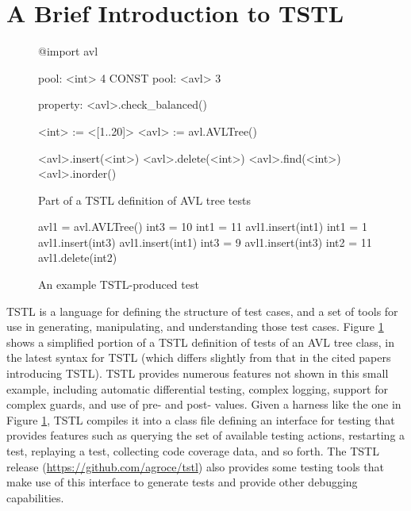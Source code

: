 \section{A Brief Introduction to TSTL}

\begin{figure}
{\scriptsize
\begin{code}
@import avl

pool: <int> 4 CONST
pool: <avl> 3

property: <avl>.check\_balanced()

<int> := <[1..20]>
<avl> := avl.AVLTree()

<avl>.insert(<int>)
<avl>.delete(<int>)
<avl>.find(<int>)
<avl>.inorder()
\end{code}
}
\caption{Part of a TSTL definition of AVL tree tests}
\label{fig:example}
\end{figure}

\begin{figure}
{\scriptsize
\begin{code}
avl1 = avl.AVLTree()  
int3 = 10  
int1 = 11  
avl1.insert(int1) 
int1 = 1  
avl1.insert(int3) 
avl1.insert(int1) 
int3 = 9  
avl1.insert(int3) 
int2 = 11  
avl1.delete(int2) 
\end{code}
}
\caption{An example TSTL-produced test}
\label{fig:avlrun}
\end{figure}

TSTL \cite{NFM15,ISSTA15} is a language for defining the structure of
test cases, and a set of tools for use in generating, manipulating,
and understanding those test cases.  Figure \ref{fig:example} shows a
simplified portion of a TSTL definition of tests of an AVL tree class,
in the latest syntax for TSTL (which differs slightly from that in the
cited papers introducing TSTL).  TSTL provides numerous features not
shown in this small example, including automatic differential testing,
complex logging, support for complex guards, and use of pre- and post-
values.  Given a harness like the one in Figure \ref{fig:example},
TSTL compiles it into a class file defining an interface for testing
that provides features such as querying the set of available testing
actions, restarting a test, replaying a test, collecting code coverage
data, and so forth.  The TSTL release
(\url{https://github.com/agroce/tstl}) also provides some testing
tools that make use of this interface to generate tests and provide
other debugging capabilities.

